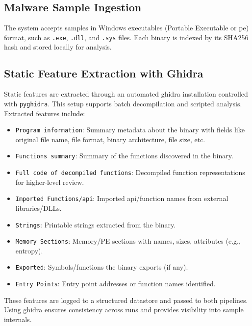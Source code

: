 \FloatBarrier

\subsection{Malware Sample Ingestion}\label{subsec:MalwareSampleIngestion}
The system accepts samples in Windows executables (Portable Executable or \gls{pe}) format, such as
\texttt{.exe}, \texttt{.dll}, and \texttt{.sys} files. Each binary is indexed by its SHA256 hash
and stored locally for analysis.

\subsection{Static Feature Extraction with Ghidra}\label{subsec:StaticFeatureExtraction}
Static features are extracted through an automated \gls{ghidra} installation controlled with
\texttt{pyghidra}. This setup supports batch decompilation and scripted analysis. Extracted
features include:
\begin{itemize}
      \item \texttt{Program information}: Summary metadata about the binary with
            fields like original file name, file format, binary architecture, file
            size, etc.
      \item \texttt{Functions summary}: Summary of the functions discovered in the binary.
      \item \texttt{Full code of decompiled functions}: Decompiled function representations for higher-level review.
      \item \texttt{Imported Functions/\gls{api}}: Imported \gls{api}/function names from external libraries/DLLs.
      \item \texttt{Strings}: Printable strings extracted from the binary.
      \item \texttt{Memory Sections}: Memory/PE sections with names, sizes, attributes (e.g., entropy).
      \item \texttt{Exported}: Symbols/functions the binary exports (if any).
      \item \texttt{Entry Points}: Entry point addresses or function names identified.
\end{itemize}

These features are logged to a structured datastore and passed to both pipelines. Using
\gls{ghidra} ensures consistency across runs and provides visibility into sample internals.

